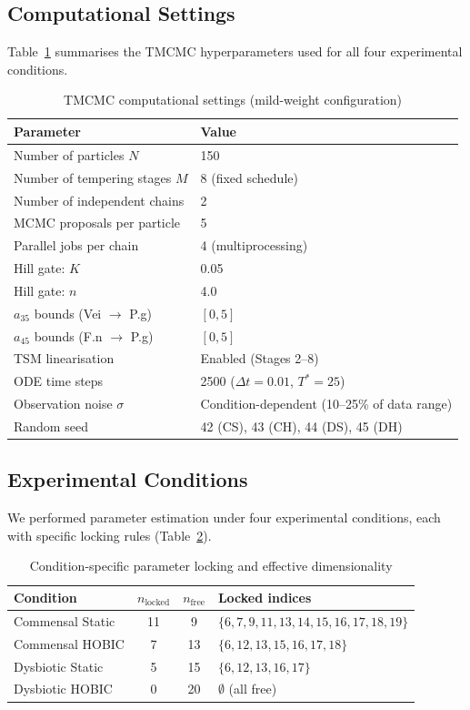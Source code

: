 \documentclass[11pt,a4paper]{article}
\begin{document}
\subsection{Computational Settings}

Table~\ref{tab:tmcmc_settings} summarises the TMCMC hyperparameters used for all four experimental conditions.

\begin{table}[H]
\centering
\caption{TMCMC computational settings (mild-weight configuration)}
\label{tab:tmcmc_settings}
\begin{tabular}{ll}
\toprule
\textbf{Parameter} & \textbf{Value} \\
\midrule
Number of particles $N$ & 150 \\
Number of tempering stages $M$ & 8 (fixed schedule) \\
Number of independent chains & 2 \\
MCMC proposals per particle & 5 \\
Parallel jobs per chain & 4 (multiprocessing) \\
Hill gate: $K$ & 0.05 \\
Hill gate: $n$ & 4.0 \\
$a_{35}$ bounds (Vei $\to$ P.g) & $[0, 5]$ \\
$a_{45}$ bounds (F.n $\to$ P.g) & $[0, 5]$ \\
TSM linearisation & Enabled (Stages 2--8) \\
ODE time steps & 2500 ($\Delta t = 0.01$, $T^* = 25$) \\
Observation noise $\sigma$ & Condition-dependent (10--25\% of data range) \\
Random seed & 42 (CS), 43 (CH), 44 (DS), 45 (DH) \\
\bottomrule
\end{tabular}
\end{table}

\subsection{Experimental Conditions}

We performed parameter estimation under four experimental conditions, each with specific locking rules (Table~\ref{tab:condition_locking}).

\begin{table}[H]
\centering
\caption{Condition-specific parameter locking and effective dimensionality}
\label{tab:condition_locking}
\begin{tabular}{lccl}
\toprule
\textbf{Condition} & $n_\mathrm{locked}$ & $n_\mathrm{free}$ & \textbf{Locked indices} \\
\midrule
Commensal Static  & 11 & 9  & $\{6,7,9,11,13,14,15,16,17,18,19\}$ \\
Commensal HOBIC   &  7 & 13 & $\{6,12,13,15,16,17,18\}$ \\
Dysbiotic Static  &  5 & 15 & $\{6,12,13,16,17\}$ \\
Dysbiotic HOBIC   &  0 & 20 & $\emptyset$ (all free) \\
\bottomrule
\end{tabular}
\end{table}
\end{document}
